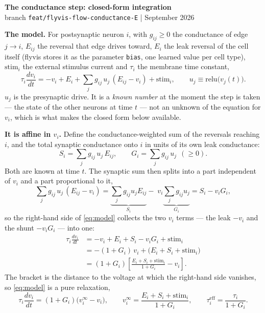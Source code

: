 \documentclass[10pt,a4paper]{article}
\begin{document}
\begin{center}
{\large\bfseries The conductance step: closed-form integration}\\[0.2em]
{\small branch \texttt{feat/flyvis-flow-conductance-E} \quad| September 2026}
\end{center}

\textbf{The model.} For postsynaptic neuron $i$, with $g_{ij}\ge 0$ the
conductance of edge $j\!\to\!i$, $E_{ij}$ the reversal that edge drives toward,
$E_i$ the leak reversal of the cell itself (flyvis stores it as the parameter
\texttt{bias}, one learned value per cell type), $\mathrm{stim}_i$ the external
stimulus current and $\tau_i$ the membrane time constant,
\begin{equation}
\tau_i\frac{dv_i}{dt}
= -v_i + E_i + \sum_j g_{ij}\,u_j\,(E_{ij}-v_i) + \mathrm{stim}_i ,
\qquad u_j \equiv \mathrm{relu}\bigl(v_j(t)\bigr).
\label{eq:model}
\end{equation}
$u_j$ is the presynaptic drive. It is a \emph{known number} at the moment the step
is taken --- the state of the other neurons at time $t$ --- not an unknown of the
equation for $v_i$, which is what makes the closed form below available.

\textbf{It is affine in $v_i$.} Define the conductance-weighted sum of the
reversals reaching $i$, and the total synaptic conductance onto $i$ in units of
its own leak conductance:
\begin{equation}
S_i=\sum_j g_{ij}\,u_j\,E_{ij},
\qquad
G_i=\sum_j g_{ij}\,u_j\ \ (\ge 0).
\end{equation}
Both are known at time $t$. The synaptic sum then splits into a part independent
of $v_i$ and a part proportional to it,
\begin{equation}
\sum_j g_{ij}\,u_j\,(E_{ij}-v_i)
=\underbrace{\sum_j g_{ij}u_jE_{ij}}_{S_i}
-\;v_i\underbrace{\sum_j g_{ij}u_j}_{G_i}
= S_i - v_i G_i ,
\end{equation}
so the right-hand side of \eqref{eq:model} collects the two $v_i$ terms --- the
leak $-v_i$ and the shunt $-v_iG_i$ --- into one:
\begin{align}
\tau_i\frac{dv_i}{dt}
&= -v_i + E_i + S_i - v_iG_i + \mathrm{stim}_i \nonumber\\[0.15em]
&= -(1+G_i)\,v_i + \bigl(E_i+S_i+\mathrm{stim}_i\bigr) \nonumber\\[0.15em]
&= (1+G_i)\left[\frac{E_i+S_i+\mathrm{stim}_i}{1+G_i}-v_i\right] .
\end{align}
The bracket is the distance to the voltage at which the right-hand side vanishes,
so \eqref{eq:model} is a pure relaxation,
\begin{equation}
\tau_i\frac{dv_i}{dt}=(1+G_i)\bigl(v^{\infty}_i-v_i\bigr),
\qquad
v^{\infty}_i=\frac{E_i+S_i+\mathrm{stim}_i}{1+G_i},
\qquad
\tau^{\mathrm{eff}}_i=\frac{\tau_i}{1+G_i}.
\label{eq:relax}
\end{equation}
\end{document}
